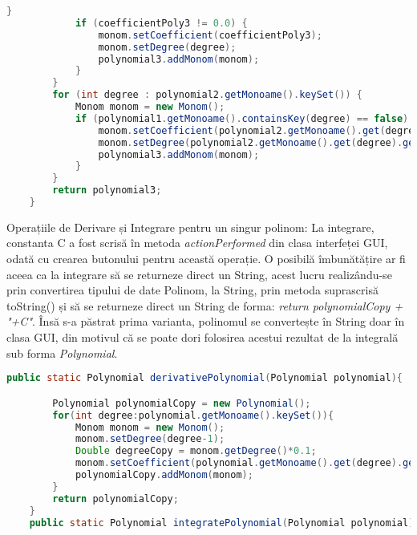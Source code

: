 \documentclass[a4paper,12pt]{article}
\begin{document}
\begin{enumerate}
\begin{enumerate}
\begin{lstlisting}[language = Java]
            }
            if (coefficientPoly3 != 0.0) {
                monom.setCoefficient(coefficientPoly3);
                monom.setDegree(degree);
                polynomial3.addMonom(monom);
            }
        }
        for (int degree : polynomial2.getMonoame().keySet()) {
            Monom monom = new Monom();
            if (polynomial1.getMonoame().containsKey(degree) == false) {
                monom.setCoefficient(polynomial2.getMonoame().get(degree).getCoefficient());
                monom.setDegree(polynomial2.getMonoame().get(degree).getDegree());
                polynomial3.addMonom(monom);
            }
        }
        return polynomial3;
    }
\end{lstlisting}
\newline
Operațiile de Derivare și Integrare pentru un singur polinom:
\newline
La integrare, constanta C a fost scrisă în metoda \emph{actionPerformed} din clasa interfeței GUI, odată cu crearea butonului pentru această operație. O posibilă îmbunătățire ar fi aceea ca la integrare să se returneze direct un String, acest lucru realizându-se prin convertirea tipului de date Polinom, la String, prin metoda suprascrisă toString() și să se returneze direct un String de forma: \emph{return polynomialCopy + "+C"}. Însă s-a păstrat prima varianta, polinomul se convertește în String doar în clasa GUI, din motivul că se poate dori folosirea acestui rezultat de la integrală sub forma \emph{Polynomial}.
\newline
\begin{lstlisting}[language = Java]
    public static Polynomial derivativePolynomial(Polynomial polynomial){

        Polynomial polynomialCopy = new Polynomial();
        for(int degree:polynomial.getMonoame().keySet()){
            Monom monom = new Monom();
            monom.setDegree(degree-1);
            Double degreeCopy = monom.getDegree()*0.1;
            monom.setCoefficient(polynomial.getMonoame().get(degree).getCoefficient()*degree);
            polynomialCopy.addMonom(monom);
        }
        return polynomialCopy;
    }
    public static Polynomial integratePolynomial(Polynomial polynomial){


\end{lstlisting}
\end{enumerate}
\end{enumerate}
\end{document}
